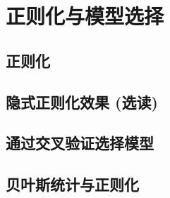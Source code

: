 \chapter{正则化与模型选择}\label{chapter:9}

\section{正则化}



\section{隐式正则化效果 (选读)}


\section{通过交叉验证选择模型}


\section{贝叶斯统计与正则化}